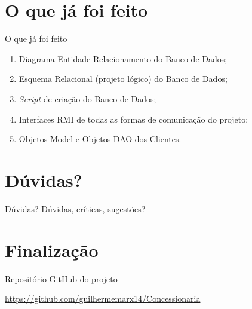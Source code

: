 \documentclass[10pt,brazil]{beamer}
\begin{document}
\section{O que já foi feito}
\begin{frame}{O que já foi feito}
	\begin{enumerate}
		\item Diagrama Entidade-Relacionamento do Banco de Dados;
		\item Esquema Relacional (projeto lógico) do Banco de Dados;
		\item \emph{Script} de criação do Banco de Dados;
		\item Interfaces RMI de todas as formas de comunicação do projeto;
		\item Objetos Model e Objetos DAO dos Clientes.
	\end{enumerate}
\end{frame}	

\section{Dúvidas?}
\begin{frame}{Dúvidas?}
Dúvidas, críticas, sugestões?
\end{frame}

\section{Finalização}

\begin{frame}{Repositório GitHub do projeto}
	
	\href{https://github.com/guilhermemarx14/Concessionaria}{https://github.com/guilhermemarx14/Concessionaria}
	
\end{frame}


	
\end{document}
